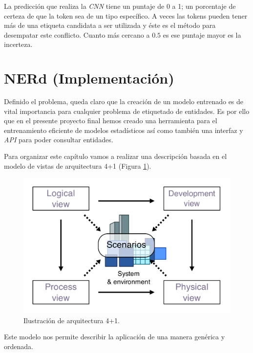 \documentclass[12pt,a4paper,]{scrartcl}
\begin{document}
La predicción que realiza la \emph{CNN} tiene un puntaje de 0 a 1; un porcentaje de certeza de que la token sea de un tipo específico. A veces las tokens pueden tener más de una etiqueta candidata a ser utilizada y éste es el método para desempatar este conflicto. Cuanto más cercano a \(0.5\) es ese puntaje mayor es la incerteza.

\newpage

\hypertarget{implementation}{%
\section{NERd (Implementación)}\label{implementation}}

Definido el problema, queda claro que la creación de un modelo entrenado es de vital importancia para cualquier problema de etiquetado de entidades.
Es por ello que en el presente proyecto final hemos creado una herramienta para el entrenamiento eficiente de modelos estadísticos así como también una interfaz y \emph{API} para poder consultar entidades.

Para organizar este capítulo vamos a realizar una descripción basada en el modelo de vistas de arquitectura 4+1 (Figura \ref{fig:arq41}).

\begin{figure}[H]

{\centering \includegraphics{assets/4+1_Architectural_View_Model.pdf} 

}

\caption{Ilustración de arquitectura 4+1.}\label{fig:arq41}
\end{figure}

Este modelo nos permite describir la aplicación de una manera genérica y ordenada.
\end{document}
